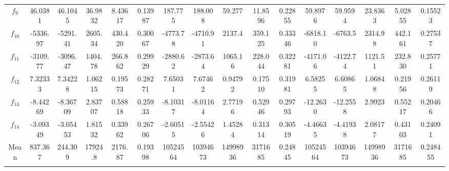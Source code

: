 \documentclass[paper=a4, fontsize=11pt]{scrartcl} %
\numberwithin{equation}{section} %
\numberwithin{figure}{section} %
\numberwithin{table}{section} %
\begin{document}
\begin{landscape}
\begin{table}
\begin{tabular}{c|ccccc|ccccc|ccccc}
			$f_{9}$  &  46.0381 &  46.1045 & 36.9832 & 8.43617 & 0.13987 &  187.775 &  188.008 & 59.277  & 11.8596 & 0.22855 &  59.8976 &  59.9594 & 23.8363 & 5.02855 & 0.15523\\
			$f_{10}$ & -5336.97 & -5291.41 & 2605.34 & 430.420 & 0.30067 & -4773.78 & -4710.91 & 2137.4  & 359.125 & 0.33346 & -6818.10 & -6763.5  & 2314.98 & 442.161 & 0.27537\\
			$f_{11}$ & -3109.77 & -3096.47 & 1404.78 & 266.862 & 0.29929 & -2880.62 & -2873.64 & 1065.16 & 228.044 & 0.32281 & -4171.06 & -4122.74 & 1121.51 & 232.830 & 0.25771\\
			$f_{12}$ &  7.32333 &  7.34228 & 1.06215 & 0.19573 & 0.28271 &  7.65031 &  7.67462 & 0.94792 & 0.17510 & 0.31981 &  6.58255 &  6.60865 & 1.06848 & 0.21956 & 0.26119\\
			$f_{13}$ & -8.44269 & -8.36709 & 2.83707 & 0.58818 & 0.25933 & -8.10317 & -8.01164 & 2.77196 & 0.52946 & 0.29793 & -12.2630 & -12.2558 & 2.9923  & 0.55217 & 0.20466\\
			$f_{14}$ & -3.09349 & -3.05453 & 1.81532 & 0.33962 & 0.26706 & -2.60515 & -2.55426 & 1.45284 & 0.31314 & 0.30519 & -4.46635 & -4.41938 & 2.08177 & 0.43103 & 0.24091\\
			
			\noalign{\smallskip}\hline\noalign{\smallskip}
			Mean & 837.367 & 244.309 & 17924.8 & 2176.87 & 0.19398 & 10524564 & 10394673 & 14998936 & 3171685 & 0.24845 & 10524564 & 10394673 & 14998936 & 3171685 & 0.248455\\
			\noalign{\smallskip}\hline\noalign{\smallskip}
			\multicolumn{16}{l}{\tiny $^1$ 3.2GHz AMD Ryzen 7 1700X, 16 GB RAM}
		\end{tabular}\label{DE_20}
	\end{table}
\end{landscape}

\pagebreak
\end{document}
